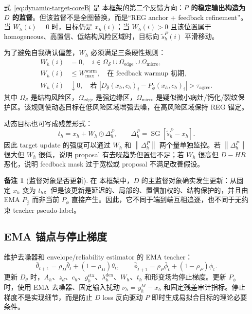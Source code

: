 \documentclass[11pt,a4paper,UTF8,fontset=fandol]{ctexart}
\theoremstyle{definition}
\newtheorem{remark}[theorem]{备注}
\DeclareMathOperator{\SG}{SG}
\newcommand{\norm}[1]{\left\lVert#1\right\rVert}
\begin{document}
式~\eqref{eq:dynamic-target-coreB} 是 本框架的第二个反馈方向：\textbf{$P$ 的稳定输出构造为 $D$ 的监督}。但该监督不是全图替换，而是“REG anchor + feedback refinement”。当 $W_h(i)=0$ 时，目标仍是 $x_h(i)$；当 $W_h(i)>0$ 且该位置属于 homogeneous、高置信、低结构风险区域时，目标向 $\tilde s_h^P(i)$ 平滑移动。

为了避免自我确认偏差，$W_h$ 必须满足三条硬性规则：
\begin{align}
\label{eq:feedback-rules-coreB}
    W_h(i)&=0,\quad i\in\Omega_{\mathcal S}\cup\Omega_{\mathrm{edge}}\cup\Omega_{\mathrm{micro}},\\
    W_h(i)&\le W_{\max}^{\mathrm{warm}},\quad \text{在 feedback warmup 初期},\\
    W_h(i)&\downarrow 0,\quad \text{若 } |D_{\bar\theta}(x_h,c_h)_i-P_{\bar\phi}(x_h,c_h)_i|>\tau_{\mathrm{agree}}.
\end{align}
其中 $\Omega_{\mathcal S}$ 是结构风险区，$\Omega_{\mathrm{edge}}$ 是强边缘区，$\Omega_{\mathrm{micro}}$ 是疑似微小病灶/钙化/裂纹保护区。该规则使动态目标在低风险区域增强去噪，在高风险区域保持 REG 锚定。

动态目标也可写成残差形式：
\begin{equation}
\label{eq:target-update-residual-coreB}
    t_h=x_h+W_h\odot\Delta_h^P,
    \qquad
    \Delta_h^P=\SG[\tilde s_h^P-x_h].
\end{equation}
因此 target update 的强度可以通过 $W_h$ 和 $\norm{\Delta_h^P}$ 两个量单独监控。若 $\norm{\Delta_h^P}$ 很大但 $W_h$ 很低，说明 proposal 有去噪趋势但置信不足；若 $W_h$ 很高但 $D-HR$ 恶化，说明 feedback mask 过于宽松或 proposal 不满足改善假设。

\begin{remark}[监督对象是否更新]
在 本框架中，$D$ 的主监督对象确实发生更新：从固定 $x_h$ 变为 $t_h$。但是该更新是延迟的、局部的、置信加权的、结构保护的，并且由 EMA $P_{\bar\phi}$ 而非当前 $P_\phi$ 直接产生。因此，它不同于端到端互相追逐，也不同于无约束 teacher pseudo-label。
\end{remark}

\subsection{EMA 锚点与停止梯度}

维护去噪器和 envelope/reliability estimator 的 EMA teacher：
\begin{equation}
\label{eq:ema-theta-coreA}
    \bar\theta_{t+1}=\rho_D\bar\theta_t+(1-\rho_D)\theta_t,
    \qquad
    \bar\phi_{t+1}=\rho_P\bar\phi_t+(1-\rho_P)\phi_t.
\end{equation}
更新 $D_\theta$ 时，$A_h$、$z_d$、$c_h$、$g_h^{\mathrm{ctx}}$、$\lambda_h^{\mathrm{den}}$、$W_h$、$t_h$ 和形变场均停止梯度。更新 $P_\phi$ 时，使用 EMA 去噪器、固定输入扰动 $\nu_h=y_h^M-x_h$ 和固定残差审计指标。停止梯度不是实现细节，而是防止 $D$ loss 反向驱动 $P$ 即时生成易拟合目标的理论必要条件。
\end{document}
